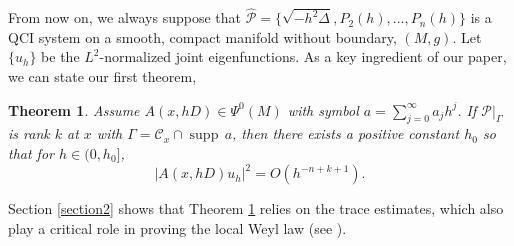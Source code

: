 \documentclass[12pt,reqno]{amsart}
\renewcommand{\epsilon}{\varepsilon}
\newcommand{\supp}{{\operatorname{supp\,}}}
\newtheorem{maintheo}{{\sc Theorem}}
\numberwithin{equation}{section}
\newenvironment{rem}{\medskip\noindent{\it Remark:\/} }{\medskip}
\newtheorem{defn}[theo]{{\sc Definition}}
\begin{document}
From now on, we always suppose that $\hat{\mathcal{P}}=\{\sqrt{-h^2\Delta},P_2(h),\dots, P_n(h)\}$ is a QCI system on a smooth, compact manifold without boundary, $(M,g)$. Let $\{u_h\}$ be the $L^2$-normalized joint eigenfunctions.
As a key ingredient of our paper, we can state our first theorem,
\begin{maintheo}\label{trace}
Assume $A(x, hD)\in \Psi^0(M)$ with symbol $a=\sum_{j=0}^\infty a_j h^j$. If $\mathcal{P}|_\Gamma$ is rank $k$ at $x$ with $\Gamma=\mathcal{C}_x\cap \supp a$, then there exists a positive constant $h_0$ so that for $h\in (0, h_0]$, 
\begin{equation}\label{main cor eq}
|A(x,hD) u_{h}|^2=O(h^{-n+k+1}).
\end{equation}
\end{maintheo}

\begin{rem}
Section \ref{section2} shows that Theorem \ref{trace} relies on the trace estimates, which also play a critical role in proving the local Weyl law (see \cite[Section 5]{So2014}).
\end{rem}






\end{document}

